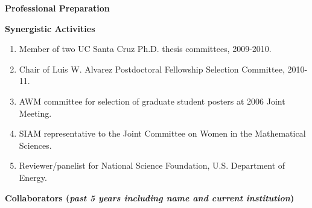 \documentclass[11pt,letterpaper,english]{article}
\begin{document}
\begin{flushleft} {\bf Professional Preparation}

\vspace{.04in}
{\bf Synergistic Activities}
\vspace{-6pt}
\begin{enumerate} \itemsep1pt \parskip0pt 
\item Member of two UC Santa Cruz Ph.D. thesis committees, 2009-2010.  \\ 
\item Chair of Luis W. Alvarez Postdoctoral Fellowship Selection Committee, 2010-11.  \\ 
\item AWM committee for selection of graduate student posters at 2006 Joint Meeting.  \\ 
\item SIAM representative to the Joint Committee on Women in the Mathematical Sciences.  \\ 
\item Reviewer/panelist for National Science Foundation, U.S. Department of Energy.  \\ 
\end{enumerate} 

\vspace{-6pt}
{\bf Collaborators ({\emph{past 5 years including name and current institution}})} 
{\parindent 16pt

}
\end{flushleft}
\end{document}
